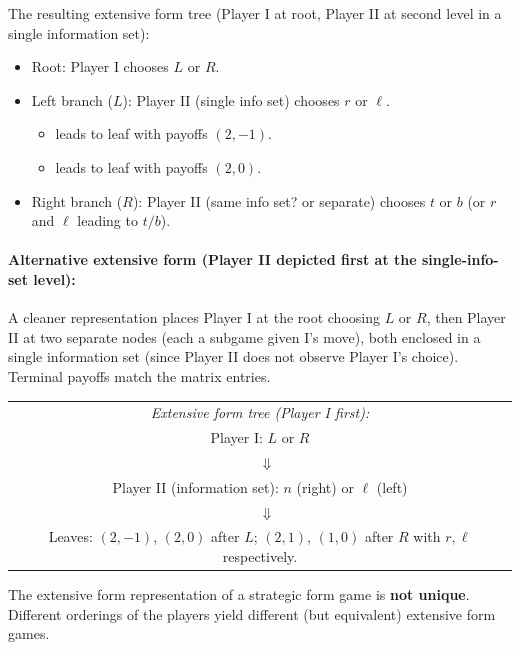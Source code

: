 \documentclass[12pt, a4paper]{article}
\begin{document}
The resulting extensive form tree (Player I at root, Player II at second level in a single information set):
\begin{itemize}
  \item Root: Player I chooses $L$ or $R$.
  \item Left branch ($L$): Player II (single info set) chooses $r$ or $\ell$.
    \begin{itemize}
      \item[$r$:] leads to leaf with payoffs $(2,-1)$.
      \item[$\ell$:] leads to leaf with payoffs $(2,0)$.
    \end{itemize}
  \item Right branch ($R$): Player II (same info set? or separate) chooses $t$ or $b$ (or $r$ and $\ell$ leading to $t/b$).
\end{itemize}

\paragraph{Alternative extensive form (Player II depicted first at the single-info-set level):}

A cleaner representation places Player I at the root choosing $L$ or $R$, then Player II at two separate nodes (each a subgame given I's move), both enclosed in a single information set (since Player II does not observe Player I's choice). Terminal payoffs match the matrix entries.

\begin{center}
\begin{tabular}{c}
\textit{Extensive form tree (Player I first):}\\[6pt]
Player I: $L$ or $R$ \\
$\quad\Downarrow$ \\
Player II (information set): $n$ (right) or $\ell$ (left) \\
$\quad\Downarrow$ \\
Leaves: $(2,-1)$, $(2,0)$ after $L$; $(2,1)$, $(1,0)$ after $R$ with $r,\ell$ respectively.
\end{tabular}
\end{center}

\begin{notebox}
The extensive form representation of a strategic form game is \textbf{not unique}. Different orderings of the players yield different (but equivalent) extensive form games.
\end{notebox}
\end{document}
